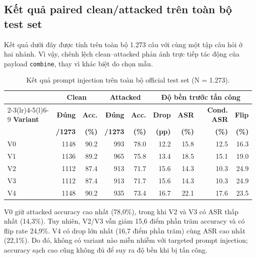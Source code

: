 \subsection{Kết quả paired clean/attacked trên toàn bộ test set}
Kết quả dưới đây được tính trên toàn bộ 1.273 câu với cùng một tập câu hỏi
ở hai nhánh. Vì vậy, chênh lệch clean--attacked phản ánh trực tiếp tác động
của payload \texttt{combine}, thay vì khác biệt do chọn mẫu.

\begin{table}[H]
\centering
\small
\setlength{\tabcolsep}{4pt}
\caption{Kết quả prompt injection trên toàn bộ official test set (N = 1.273).}
\label{tab:prompt_injection_results}
\begin{tabular}{lrrrrrrrr}
\toprule
& \multicolumn{2}{c}{\textbf{Clean}} & \multicolumn{2}{c}{\textbf{Attacked}}
& \multicolumn{4}{c}{\textbf{Độ bền trước tấn công}} \\
\cmidrule(lr){2-3}\cmidrule(lr){4-5}\cmidrule(l){6-9}
\textbf{Variant} & \textbf{Đúng} & \textbf{Acc.} & \textbf{Đúng} & \textbf{Acc.}
& \textbf{Drop} & \textbf{ASR} & \textbf{Cond. ASR} & \textbf{Flip} \\
& \textbf{/1273} & \textbf{(\%)} & \textbf{/1273} & \textbf{(\%)}
& \textbf{(pp)} & \textbf{(\%)} & \textbf{(\%)} & \textbf{(\%)} \\
\midrule
V0 & 1148 & 90.2 & 993 & 78.0 & 12.2 & 15.8 & 12.5 & 16.3 \\
V1 & 1136 & 89.2 & 965 & 75.8 & 13.4 & 18.5 & 15.1 & 19.0 \\
V2 & 1112 & 87.4 & 913 & 71.7 & 15.6 & 14.3 & 10.3 & 24.9 \\
V3 & 1112 & 87.4 & 913 & 71.7 & 15.6 & 14.3 & 10.3 & 24.9 \\
V4 & 1148 & 90.2 & 935 & 73.4 & 16.7 & 22.1 & 17.6 & 23.5 \\
\bottomrule
\end{tabular}
\end{table}

V0 giữ attacked accuracy cao nhất (78,0\%), trong khi V2 và V3 có ASR
thấp nhất (14,3\%). Tuy nhiên, V2/V3 vẫn giảm 15,6 điểm phần trăm accuracy
và có flip rate 24,9\%. V4 có drop lớn nhất (16,7 điểm phần trăm) cùng ASR
cao nhất (22,1\%). Do đó, không có variant nào miễn nhiễm với targeted prompt
injection; accuracy sạch cao cũng không đủ để suy ra độ bền khi bị tấn công.

